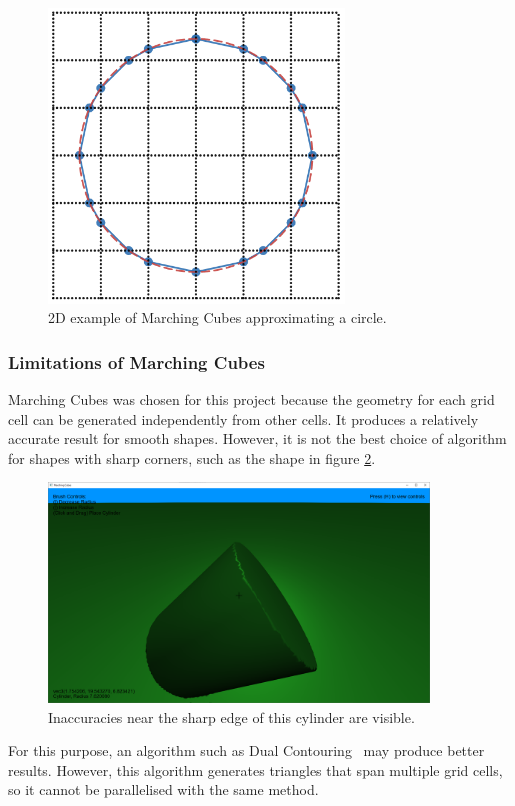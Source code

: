 \documentclass[11pt]{article}
\begin{document}
\begin{figure}[H]
  \caption{2D example of Marching Cubes approximating a circle.}
  \begin{center}
    \includegraphics[width=0.7\textwidth]{ms_example.png}
    
  \end{center}
  \label{fig:ms_example}
\end{figure}

\subsubsection{Limitations of Marching Cubes}
Marching Cubes was chosen for this project because the geometry for each grid cell can be generated independently from other cells. It produces a relatively accurate result for smooth shapes. However, it is not the best choice of algorithm for shapes with sharp corners, such as the shape in figure \ref{fig:sharp_corner}.
\begin{figure}[H]
  \begin{center}
  \includegraphics[width=0.9\textwidth]{mc_cylinder.png}
  \end{center}
  \caption{Inaccuracies near the sharp edge of this cylinder are visible.}
  \label{fig:sharp_corner}
\end{figure}
For this purpose, an algorithm such as Dual Contouring~\cite{10.1145/566654.566586} may produce better results. However, this algorithm generates triangles that span multiple grid cells, so it cannot be parallelised with the same method.
\end{document}
